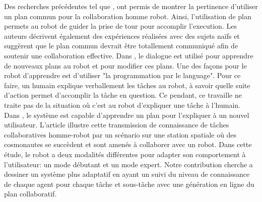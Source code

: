 \documentclass[a4paper,11pt,twoside]{StyleThese}
\begin{document}
Des recherches précédentes tel que \cite{Lallee2013}, ont permis de montrer la pertinence d'utiliser un plan commun pour la collaboration homme robot. Ainsi, l'utilisation de plan permets au robot de guider la prise de tour pour accomplir l'execution. Les auteurs décrivent également des expériences réalisées avec des sujets naïfs et suggèrent que le plan commun devrait être totallement communiqué afin de soutenir une collaboration effective. Dans \cite{Petit2012}, le dialogue est utilisé pour apprendre de nouveaux plans au robot et pour modifier ces plans. Une des façons pour le robot d'apprendre est d'utiliser "la programmation par le language". Pour ce faire, un humain explique verballement les tâches au robot, à savoir quelle suite d'action permet d'accomplir la tâche en question. Ce pendant, ce travaille ne traite pas de la situation où c'est au robot d'expliquer une tâche à l'humain.
Dans \cite{Sorce2015}, le système est capable d'apprendre un plan pour l'expliquer à un nouvel utilisateur. L'article illustre cette transmission de connaissance de tâches collaboratives homme-robot par un scénario sur une station spatiale où des cosmonautes se succèdent et sont amenés à collaborer avec un robot. Dans cette étude, le robot a deux modalités différentes pour adapter son comportement à l'utilisateur: un mode débutant et un mode expert.
Notre contribution cherche a dessiner un système plus adaptatif en ayant un suivi du niveau de connaissance de chaque agent pour chaque tâche et sous-tâche avec une génération en ligne du plan collaboratif.


\end{document}

